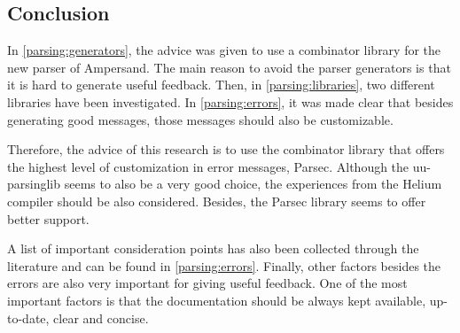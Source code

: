 
\subsection{Conclusion}
\label{parsing:conclusion}
In \autoref{parsing:generators}, the advice was given to use a combinator library for the new parser of Ampersand.
The main reason to avoid the parser generators is that it is hard to generate useful feedback.
Then, in \autoref{parsing:libraries}, two different libraries have been investigated.
In \autoref{parsing:errors}, it was made clear that besides generating good messages, those messages should also be customizable.

Therefore, the advice of this research is to use the combinator library that offers the highest level of customization in error messages, Parsec.
Although the uu-parsinglib seems to also be a very good choice, the experiences from the Helium compiler  should be also considered.
Besides, the Parsec library seems to offer better support.

A list of important consideration points has also been collected through the literature and can be found in \autoref{parsing:errors}.
Finally, other factors besides the errors are also very important for giving useful feedback.
One of the most important factors is that the documentation should be always kept available, up-to-date, clear and concise.

